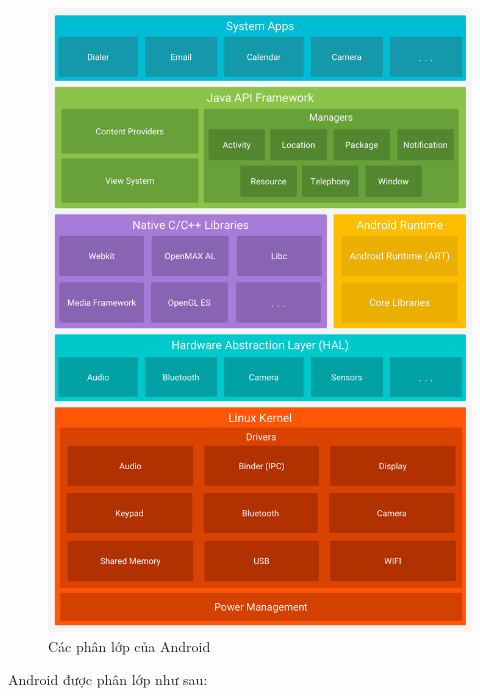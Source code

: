 \documentclass[../../thesis]{subfiles}
\begin{document}
\begin{figure}
    \centering
    \includegraphics[width=\linewidth]{../images/android-stack_2x.png}
    \vspace*{-10mm}
    \caption{Các phân lớp của Android \cite{GOOGL_ANDR_ARCH}}
    \label{fig:android-stack}
\end{figure}

Android được phân lớp như sau:
\end{document}
